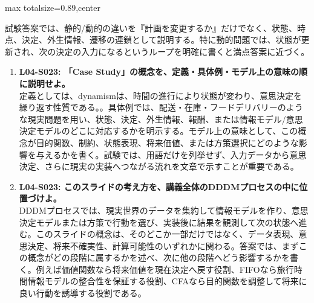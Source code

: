 \begin{minipage}[t]{0.58\textwidth}
\begin{adjustbox}{max totalsize={\textwidth}{0.89\textheight},center}
\begin{minipage}{\textwidth}
試験答案では、静的/動的の違いを『計画を変更するか』だけでなく、状態、時点、決定、外生情報、遷移の連鎖として説明する。特に動的問題では、状態が更新され、次の決定の入力になるというループを明確に書くと満点答案に近づく。\par{}\begin{enumerate}\item \textbf{L04-S023: 「Case Study」の概念を、定義・具体例・モデル上の意味の順に説明せよ。}\\定義としては、dynamismは、時間の進行により状態が変わり、意思決定を繰り返す性質である。。具体例では、配送・在庫・フードデリバリーのような現実問題を用い、状態、決定、外生情報、報酬、または情報モデル/意思決定モデルのどこに対応するかを明示する。モデル上の意味として、この概念が目的関数、制約、状態表現、将来価値、または方策選択にどのような影響を与えるかを書く。試験では、用語だけを列挙せず、入力データから意思決定、さらに現実の実装へつながる流れを文章で示すことが重要である。\item \textbf{L04-S023: このスライドの考え方を、講義全体のDDDMプロセスの中に位置づけよ。}\\DDDMプロセスでは、現実世界のデータを集約して情報モデルを作り、意思決定モデルまたは方策で行動を選び、実装後に結果を観測して次の状態へ進む。このスライドの概念は、そのどこか一部だけではなく、データ表現、意思決定、将来不確実性、計算可能性のいずれかに関わる。答案では、まずこの概念がどの段階に属するかを述べ、次に他の段階へどう影響するかを書く。例えば価値関数なら将来価値を現在決定へ戻す役割、FIFOなら旅行時間情報モデルの整合性を保証する役割、CFAなら目的関数を調整して将来に良い行動を誘導する役割である。\end{enumerate}
\end{minipage}
\end{adjustbox}
\end{minipage}


